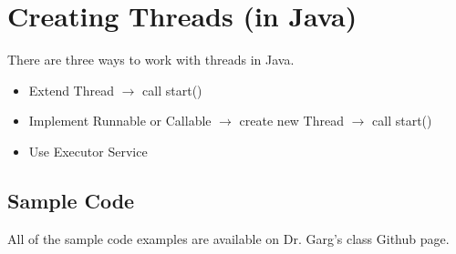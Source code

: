 \documentclass[twoside]{article}
\begin{document}
\section{Creating Threads (in Java)}
There are three ways to work with threads in Java.

\begin{itemize}
  \item Extend Thread $\rightarrow$ call start()
  \item Implement Runnable or Callable $\rightarrow$ create new Thread $\rightarrow$ call start()
  \item Use Executor Service
\end{itemize}

\subsection{Sample Code}
All of the sample code examples are available on Dr. Garg's class Github page.
\end{document}

